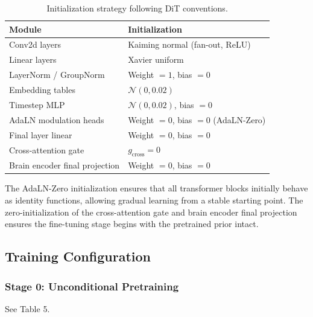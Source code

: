 \documentclass{article}
\begin{document}
\begin{table}[h]
\centering
\caption{Initialization strategy following DiT conventions.}
\label{tab:init}
\begin{tabular}{ll}
\toprule
\textbf{Module} & \textbf{Initialization} \\
\midrule
Conv2d layers & Kaiming normal (fan-out, ReLU) \\
Linear layers & Xavier uniform \\
LayerNorm / GroupNorm & Weight $= 1$, bias $= 0$ \\
Embedding tables & $\mathcal{N}(0, 0.02)$ \\
Timestep MLP & $\mathcal{N}(0, 0.02)$, bias $= 0$ \\
AdaLN modulation heads & Weight $= 0$, bias $= 0$ (AdaLN-Zero) \\
Final layer linear & Weight $= 0$, bias $= 0$ \\
Cross-attention gate & $g_{\text{cross}} = 0$ \\
Brain encoder final projection & Weight $= 0$, bias $= 0$ \\
\bottomrule
\end{tabular}
\end{table}
 
\noindent The AdaLN-Zero initialization ensures that all transformer blocks initially behave as identity functions, allowing gradual learning from a stable starting point. The zero-initialization of the cross-attention gate and brain encoder final projection ensures the fine-tuning stage begins with the pretrained prior intact.
 
\subsection{Training Configuration}
 
\subsubsection{Stage 0: Unconditional Pretraining}
See Table 5.
 
\end{document}
